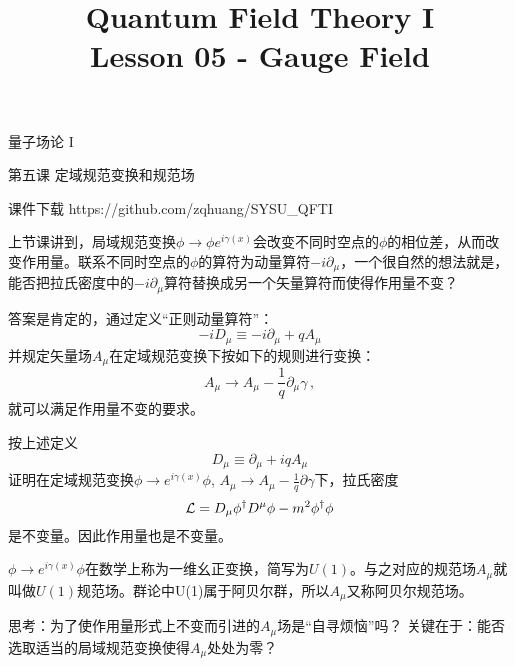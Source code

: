 \documentclass[CJK]{beamer}
\title{Quantum Field Theory I \\ Lesson 05 - Gauge Field}
\author{}
\date{}
\begin{document}
\begin{frame}
 
\begin{center}
\begin{Large}
\bch
量子场论 I 

{\vskip 0.3in}

第五课 定域规范变换和规范场

\ech
\end{Large}
\end{center}

\vskip 0.2in

\bch
课件下载
\ech
https://github.com/zqhuang/SYSU\_QFTI

\end{frame}



\begin{frame}
\bch
上节课讲到，局域规范变换$\phi \rightarrow \phi e^{i\gamma(x)}$会改变不同时空点的$\phi$的相位差，从而改变作用量。联系不同时空点的$\phi$的算符为动量算符$-i\partial_\mu$，一个很自然的想法就是，能否把拉氏密度中的$-i\partial_\mu$算符替换成另一个矢量算符而使得作用量不变？

\skipline
答案是肯定的，通过定义“正则动量算符”：
$$-iD_\mu \equiv -i\partial_\mu + q A_\mu$$
并规定矢量场$A_\mu$在定域规范变换下按如下的规则进行变换：
$$ A_\mu \rightarrow A_\mu - \frac{1}{q} \partial_\mu \gamma\, ,$$
就可以满足作用量不变的要求。

\ech
\end{frame}

\begin{frame}
\bch
按上述定义
$$D_\mu \equiv \partial_\mu + iq A_\mu$$
证明在定域规范变换$\phi \rightarrow e^{i\gamma(x)}\phi$, $A_\mu \rightarrow A_\mu - \frac{1}{q}\partial\gamma$下，拉氏密度
$${\mathcal{L}} = D_\mu\phi^\dagger D^\mu\phi - m^2\phi^\dagger \phi$$
是不变量。因此作用量也是不变量。

\skipline
$\phi \rightarrow e^{i\gamma(x)}\phi$在数学上称为一维幺正变换，简写为$U(1)$。与之对应的规范场$A_\mu$就叫做$U(1)$规范场。群论中U(1)属于阿贝尔群，所以$A_\mu$又称阿贝尔规范场。
\ech
\end{frame}

\begin{frame}
\bch
思考：为了使作用量形式上不变而引进的$A_\mu$场是“自寻烦恼”吗？
\skipline
关键在于：能否选取适当的局域规范变换使得$A_\mu$处处为零？
\ech
\end{frame}
\end{document}
